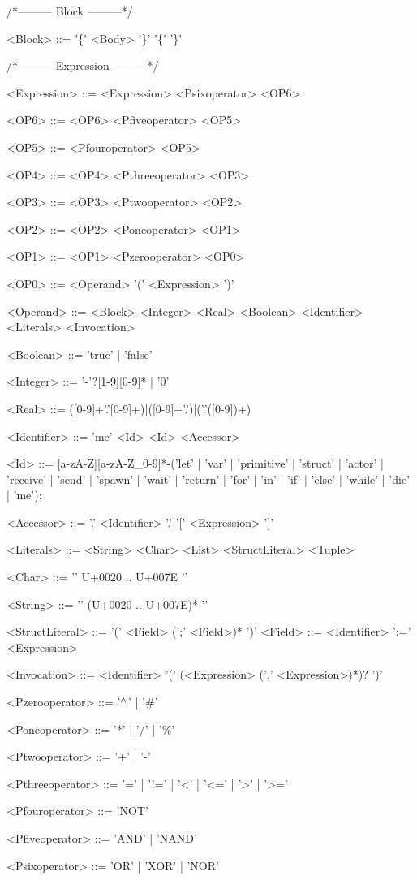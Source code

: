 /*--------- Block ---------*/
\begin{grammar}
<Block> ::= '\{' <Body> '\}'
 \alt '\{' '\}'

\end{grammar}
/*--------- Expression ---------*/
\begin{grammar}
<Expression> ::= <Expression> <Psixoperator> <OP6>

<OP6> ::= <OP6> <Pfiveoperator> <OP5>

<OP5> ::= <Pfouroperator> <OP5>

<OP4> ::= <OP4> <Pthreeoperator> <OP3>

<OP3> ::= <OP3> <Ptwooperator> <OP2>

<OP2> ::= <OP2> <Poneoperator> <OP1>

<OP1> ::= <OP1> <Pzerooperator> <OP0>

<OP0> ::= <Operand>
 \alt '(' <Expression> ')'

<Operand> ::= <Block>
 \alt <Integer>
 \alt <Real>
 \alt <Boolean>
 \alt <Identifier>
 \alt <Literals>
 \alt <Invocation>

<Boolean> ::= 'true' | 'false'

<Integer> ::= '-'?[1-9][0-9]* | '0'

<Real> ::= ([0-9]+'.'[0-9]+)|([0-9]+'.')|('.'([0-9])+)

<Identifier> ::= 'me'
 \alt <Id>
 \alt <Id> <Accessor>

<Id> ::= [a-zA-Z][a-zA-Z\_0-9]*-('let' | 'var' | 'primitive' | 'struct' | 'actor' | 'receive' | 'send' | 'spawn' | 'wait' | 'return' | 'for' | 'in' | 'if' | 'else' | 'while' | 'die' | 'me');

<Accessor> ::= '.' <Identifier>
 \alt '.' '[' <Expression> ']'

<Literals> ::= <String>
 \alt <Char>
 \alt <List>
 \alt <StructLiteral>
 \alt <Tuple>

<Char> ::= '\textquotesingle' U+0020 .. U+007E '\textquotesingle'

<String> ::= '\textquotedbl' (U+0020 .. U+007E)* '\textquotedbl'

<StructLiteral> ::= '(' <Field> (';' <Field>)* ')'
<Field> ::= <Identifier> ':=' <Expression>

<Invocation> ::= <Identifier> '(' (<Expression> (',' <Expression>)*)? ')'

<Pzerooperator> ::= '$^\wedge{}$' | '\#'

<Poneoperator> ::= '*' | '/' | '\%'

<Ptwooperator> ::= '+' | '-'

<Pthreeoperator> ::= '=' | '!=' | '<' | '<=' | '>' | '>='

<Pfouroperator> ::= 'NOT'

<Pfiveoperator> ::= 'AND' | 'NAND'

<Psixoperator> ::= 'OR' | 'XOR' | 'NOR'
\end{grammar}
